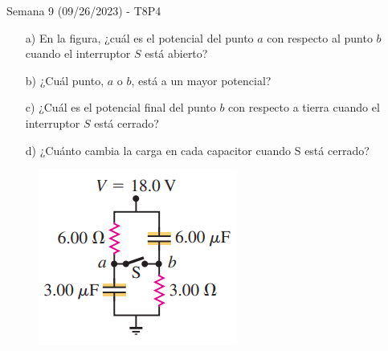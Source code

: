 \begin{frame}{Semana 9 (09/26/2023) - T8P4}

    \begin{itemize}
        \item[a)] En la figura, ¿cuál es el potencial del punto $a$ con respecto al punto $b$
cuando el interruptor $S$ está abierto?
        \item[b)] ¿Cuál punto, $a$ o $b$, está a un mayor
potencial?
        \item[c)] ¿Cuál es el potencial final
del punto $b$ con respecto a tierra cuando
el interruptor $S$ está cerrado?
        \item[d)] ¿Cuánto cambia la carga en cada capacitor
cuando S está cerrado?
    \end{itemize}

    \begin{figure}
    \centering
    \includegraphics[scale=0.6]{figures/t8p42302.png}
    \end{figure}

    
\end{frame}